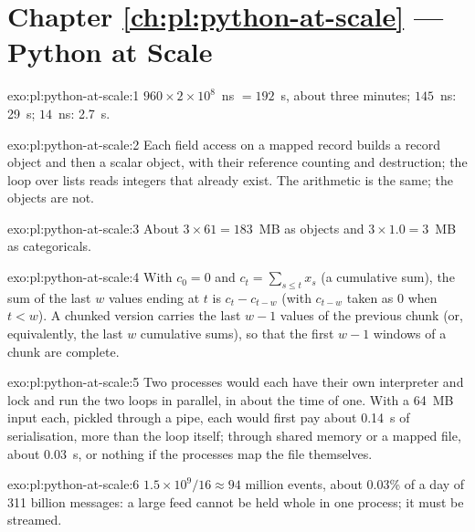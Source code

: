 \section*{Chapter \ref{ch:pl:python-at-scale} --- Python at Scale}

\begin{solution}{exo:pl:python-at-scale:1}
$960 \times 2\times10^8$~ns $= 192$~s, about three minutes; $145$~ns: 29~s; $14$~ns: 2.7~s.
\end{solution}

\begin{solution}{exo:pl:python-at-scale:2}
Each field access on a mapped record builds a record object and then a scalar object, with their reference counting and
destruction; the loop over lists reads integers that already exist. The arithmetic is the same; the objects are not.
\end{solution}

\begin{solution}{exo:pl:python-at-scale:3}
About $3 \times 61 = 183$~MB as objects and $3 \times 1.0 = 3$~MB as categoricals.
\end{solution}

\begin{solution}{exo:pl:python-at-scale:4}
With $c_0 = 0$ and $c_t = \sum_{s\le t} x_s$ (a cumulative sum), the sum of the last $w$ values ending at $t$ is $c_t - c_{t-w}$ (with
$c_{t-w}$ taken as 0 when $t < w$). A chunked version carries the last $w-1$ values of the previous chunk (or, equivalently, the last
$w$ cumulative sums), so that the first $w-1$ windows of a chunk are complete.
\end{solution}

\begin{solution}{exo:pl:python-at-scale:5}
Two processes would each have their own interpreter and lock and run the two loops in parallel, in about the time of one. With a
64~MB input each, pickled through a pipe, each would first pay about 0.14~s of serialisation, more than the loop itself; through
shared memory or a mapped file, about 0.03~s, or nothing if the processes map the file themselves.
\end{solution}

\begin{solution}{exo:pl:python-at-scale:6}
$1.5\times10^9 / 16 \approx 94$ million events, about 0.03\% of a day of 311 billion messages: a large feed cannot be held whole in one
process; it must be streamed.
\end{solution}

